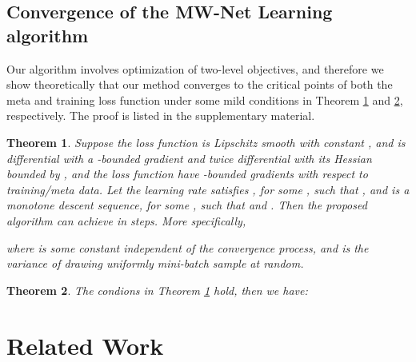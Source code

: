\documentclass{article}
\newtheorem{theorem}{Theorem}
\begin{document}
	\subsection{Convergence of the MW-Net Learning algorithm}
	Our algorithm involves optimization of two-level objectives, and therefore we show theoretically that our method converges to the critical points of both the meta and training loss function under some mild conditions in Theorem \ref{th1} and \ref{th2}, respectively. The proof is listed in the supplementary material.
	\begin{theorem} \label{th1}
		Suppose the loss function  is Lipschitz smooth with constant , and  is differential with a -bounded gradient and twice differential with its Hessian bounded by , and the loss function  have -bounded gradients with respect to training/meta data. Let the learning rate  satisfies , for some , such that , and  is a monotone descent sequence,  for some , such that  and . Then the proposed algorithm can achieve  in  steps. More specifically,
		
		where  is some constant independent of the convergence process, and  is the variance of drawing uniformly mini-batch sample at random.
	\end{theorem}
	
	\begin{theorem}\label{th2}
		The condions in Theorem \ref{th1} hold, then we have:
		
	\end{theorem}
	\vspace{0mm}
	\section{Related Work} \label{section3}\vspace{0mm}
\end{document}
